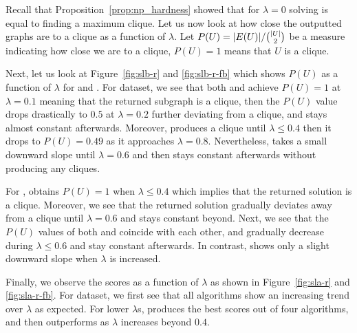 Recall that Proposition~\ref{prop:np_hardness} showed that for $\lambda = 0$ solving \prbstrwk is equal to finding a maximum clique.
Let us now look at how close the outputted graphs are to a clique as a function of $\lambda$.
Let $P(U) = {\left|E(U)\right|} /  {{\left|U\right|} \choose 2}$ be a measure indicating how close we are to a clique, $P(U) = 1$  means that $U$ is a clique.

Next, let us look at Figure~\ref{fig:slb-r} and \ref{fig:slb-r-fb} which shows $P(U)$ as a function of $\lambda$ for  and .
For  dataset, we see that both \algdenseg and \algdensec achieve  $P(U) = 1$ at $\lambda = 0.1$ meaning that the returned subgraph is a clique, then the $P(U)$ value drops drastically to $0.5$ at $\lambda = 0.2$ further deviating from a clique, and stays almost constant afterwards. 
Moreover, \alggreedyfastest produces a clique until $\lambda \leq  0.4$ then it drops to $P(U) = 0.49$ as it approaches $\lambda = 0.8$. %
Nevertheless, \alglpstc takes a small downward slope until $\lambda = 0.6$ and then stays constant afterwards without producing any cliques.

For , \alggreedyfastest obtains $P(U) = 1$ when $\lambda \leq 0.4$ which implies that the returned solution is a clique.
Moreover, we see that the returned solution gradually deviates away from a clique until $\lambda = 0.6$ and stays constant beyond.
Next, we see that the $P(U)$ values of both \algdenseg and \algdensec coincide with each other, and gradually decrease during $\lambda \leq 0.6$ and stay constant afterwards.  In contrast, \alglpstc shows only a slight downward slope when $\lambda$ is increased.


Finally, we observe the scores as a function of $\lambda$ as shown in Figure~\ref{fig:sla-r} and \ref{fig:sla-r-fb}. 
For  dataset, we first see that all algorithms show an increasing trend over $\lambda$ as expected.
For lower $\lambda$s, \alggreedyfastest produces the best scores out of four algorithms, and then \alglpstc outperforms as $\lambda$ increases beyond $0.4$.

